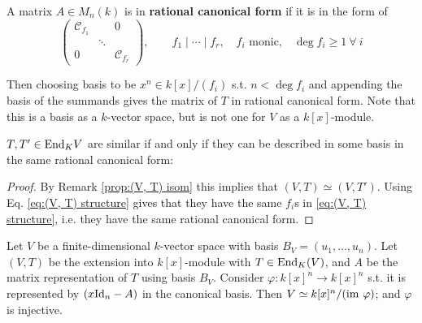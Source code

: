 \begin{definition}
    A matrix $A\in M_n(k)$ is in \textbf{rational canonical form} if it is in the form of
    \[
        \begin{pmatrix}
            \mathcal{C}_{f_1} & & 0 \\
            & \ddots & \\
            0 & & \mathcal{C}_{f_r}
        \end{pmatrix}, \qquad f_1\mid \cdots \mid f_r,\quad f_i \text{ monic,}\quad \deg f_i \geq 1\ \forall\ i
    \]
\end{definition}

Then choosing basis to be $x^n \in k[x]/(f_i)$ s.t. $n < \deg f_i$ and appending the basis of the summands gives the matrix of $T$ in rational canonical form. Note that this is a basis as a $k$-vector space, but is not one for $V$ as a $k[x]$-module. 

\begin{remark}
    $T, T'\in\mathrm{End}_K{V}$ are similar if and only if they can be described in some basis in the same rational canonical form:
\end{remark}

\begin{proof}
    By Remark \ref{prop:(V, T) isom} this implies that $(V, T) \simeq (V, T')$. Using Eq. \eqref{eq:(V, T) structure} gives that they have the same $f_i$s in \eqref{eq:(V, T) structure}, i.e. they have the same rational canonical form.
\end{proof}

\begin{proposition}
    Let $V$ be a finite-dimensional $k$-vector space with basis $B_V = (u_1, \ldots , u_n)$. Let $(V, T)$ be the extension into $k[x]$-module with $T\in\mathrm{End}_K(V)$, and $A$ be the matrix representation of $T$ using basis $B_V$. Consider $\varphi: k[x]^n \to k[x]^n$ s.t. it is represented by $(x\mathrm{Id}_n - A)$ in the canonical basis. Then $V \simeq k[x]^n/(\mathrm{im}\  \varphi)$; and $\varphi$ is injective. 
\end{proposition}

